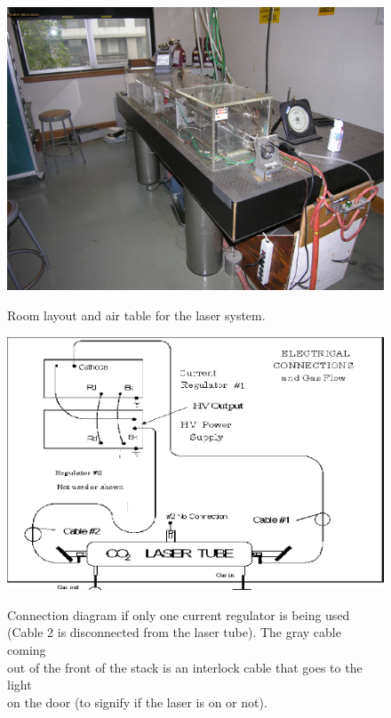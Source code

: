 \documentclass{../lab}
\begin{document}
\begin{figure}[H]
\centering
    \href{http://experimentationlab.berkeley.edu/sites/default/files/images/Co2_3.jpg}{\includegraphics[width=0.7\linewidth]{images/Co2_3.jpg}} \\
    \caption{Room layout and air table for the laser system.}
\end{figure}

\begin{figure}[H]
\captionsetup{justification=centering}
\centering
    \href{http://experimentationlab.berkeley.edu/sites/default/files/images/Co2-29-new.png}{\includegraphics[width=0.6\linewidth]{images/Co2-29-new.png}} \\
    \caption{Connection diagram if only one current regulator is being used \\(Cable 2 is disconnected from the laser tube). The gray cable coming \\out of the front of the stack is an interlock cable that goes to the light \\on the door (to signify if the laser is on or not).}
\end{figure}
\end{document}
